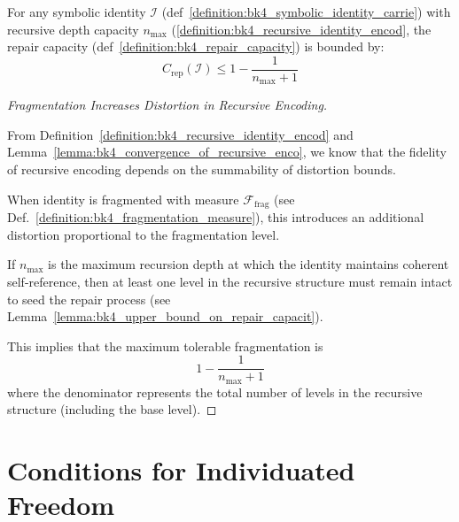 \begin{lemma} \label{lemma:bk4_upper_bound_on_repair_capacit}
For any symbolic identity $\mathcal{I}$ (def~\ref{definition:bk4_symbolic_identity_carrie}) with recursive depth capacity $n_{\text{max}}$ (\ref{definition:bk4_recursive_identity_encod}, the repair capacity (def~\ref{definition:bk4_repair_capacity}) is bounded by:
\begin{equation}
    C_{\text{rep}}(\mathcal{I}) \leq 1 - \frac{1}{n_{\text{max}} + 1}
\end{equation}
\end{lemma}
\begin{proof}[Fragmentation Increases Distortion in Recursive Encoding]
\label{proof:bk4_fragmentation_distortion_encoding}

From Definition~\ref{definition:bk4_recursive_identity_encod} and Lemma~\ref{lemma:bk4_convergence_of_recursive_enco}, we know that the fidelity of recursive encoding depends on the summability of distortion bounds. 

When identity is fragmented with measure $\mathcal{F}_{\text{frag}}$ (see Def.~\ref{definition:bk4_fragmentation_measure}), this introduces an additional distortion proportional to the fragmentation level. 

If $n_{\text{max}}$ is the maximum recursion depth at which the identity maintains coherent self-reference, then at least one level in the recursive structure must remain intact to seed the repair process (see Lemma~\ref{lemma:bk4_upper_bound_on_repair_capacit}). 

This implies that the maximum tolerable fragmentation is 
\[
1 - \frac{1}{n_{\text{max}} + 1}
\]
where the denominator represents the total number of levels in the recursive structure (including the base level).
\end{proof}
\section{Conditions for Individuated Freedom} \label{sec:bk4_conditions_individuated_freedom}
